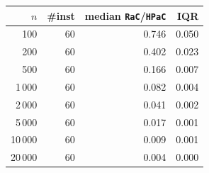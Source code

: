 \begin{tabular}{@{}rrrr@{}}
\toprule
$n$ & \#inst & median \texttt{RaC}/\texttt{HPaC} & IQR \\
\midrule
100 & 60 & 0.746 & 0.050 \\
200 & 60 & 0.402 & 0.023 \\
500 & 60 & 0.166 & 0.007 \\
1\,000 & 60 & 0.082 & 0.004 \\
2\,000 & 60 & 0.041 & 0.002 \\
5\,000 & 60 & 0.017 & 0.001 \\
10\,000 & 60 & 0.009 & 0.001 \\
20\,000 & 60 & 0.004 & 0.000 \\
\bottomrule
\end{tabular}
